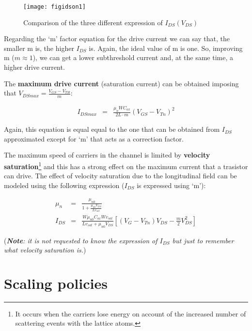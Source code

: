 \documentclass[a4paper, 12pt, twoside, openright]{report}
\begin{document}
{	\begin{figure}[H]
	\centering
	\texttt{[image: figidson1]}
	\caption{Comparison of the three different expression of $I_{DS}(V_{DS})$}
	\label{}
	\end{figure}

Regarding the `m' factor equation for the drive current we can say that, the smaller m is, the higher $I_{DS}$ is. Again, the ideal value of m is one. So, improving m ($m \approx 1$), we can get a lower subthreshold current and, at the same time, a higher drive current.

The \textbf{maximum drive current} (saturation current) can be obtained imposing that $V_{DSmax} = \frac{V_{GS} - V_{TH}}{m}$:

   \begin{eqnarray*}    
       I_{DSmax}&=& \frac{\mu_n W C_{ox}}{2L \cdot  {m}}\left(V_{GS}-V_{Tn}\right)^2
    \end{eqnarray*}

Again, this equation is equal equal to the one that can be obtained from $I_{DS}$ approximated except for `m' that acts as a correction factor.

The maximum speed of carriers in the channel is limited by \textbf{velocity saturation}\footnote{It occurs when the carriers lose energy on account of the increased number of scattering events with the lattice atoms.} and this has a strong effect on the maximum current that a trasistor can drive. The effect of velocity saturation due to the longitudinal field can be modeled using the following expression ($I_{DS}$ is expressed using `m'):

	\begin{eqnarray*}
	     \mu_n&=&\frac{\mu_{n0}}{1+\frac{\mu_{n0}V_{DS}}{Lv_{sat}}}\\[2ex]
	   I_{DS} &=&\frac{W \mu_{n0} C_{ox}Wv_{sat}}{Lv_{sat}+\mu_{n0}V_{DS}}
	             \left[\left(V_G-V_{Tn}\right)V_{DS}-\frac{ {m}}{2}V_{DS}^2\right]
	\end{eqnarray*}

(\emph{\textbf{Note}: it is not requested to know the expression of $I_{DS}$ but just to remember what velocity saturation is.})




\section{Scaling policies}

}
\end{document}

